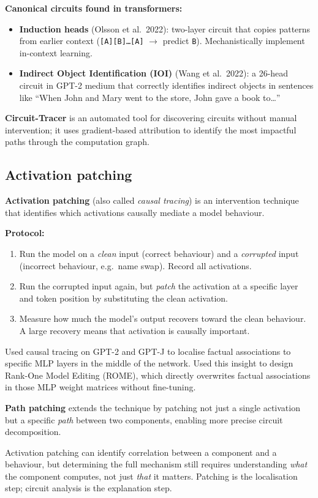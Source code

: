 \textbf{Canonical circuits found in transformers:}
\begin{itemize}
  \item \textbf{Induction heads} (Olsson et al.\ 2022): two-layer circuit that copies
    patterns from earlier context (\texttt{[A][B]\ldots[A]} $\to$ predict \texttt{B}).
    Mechanistically implement in-context learning.
  \item \textbf{Indirect Object Identification (IOI)} (Wang et al.\ 2022): a 26-head
    circuit in GPT-2 medium that correctly identifies indirect objects in sentences like
    ``When John and Mary went to the store, John gave a book to\ldots''
\end{itemize}

\textbf{Circuit-Tracer} is an automated tool for discovering circuits without manual
intervention; it uses gradient-based attribution to identify the most impactful paths
through the computation graph.

\subsection{Activation patching}

\textbf{Activation patching} (also called \emph{causal tracing}) is an intervention
technique that identifies which activations causally mediate a model behaviour.

\textbf{Protocol:}
\begin{enumerate}
  \item Run the model on a \emph{clean} input (correct behaviour) and a \emph{corrupted}
    input (incorrect behaviour, e.g.\ name swap). Record all activations.
  \item Run the corrupted input again, but \emph{patch} the activation at a specific
    layer and token position by substituting the clean activation.
  \item Measure how much the model's output recovers toward the clean behaviour.
    A large recovery means that activation is causally important.
\end{enumerate}

\begin{paperbox}[title={ROME / MEMIT (Meng et al.\ 2022)}]
  Used causal tracing on GPT-2 and GPT-J to localise factual associations to specific
  MLP layers in the middle of the network. Used this insight to design
  Rank-One Model Editing (ROME), which directly overwrites factual associations
  in those MLP weight matrices without fine-tuning.
\end{paperbox}

\textbf{Path patching} extends the technique by patching not just a single activation
but a specific \emph{path} between two components, enabling more precise circuit
decomposition.

\begin{warnbox}
  Activation patching can identify correlation between a component and a behaviour,
  but determining the full mechanism still requires understanding \emph{what} the
  component computes, not just \emph{that} it matters. Patching is the localisation
  step; circuit analysis is the explanation step.
\end{warnbox}
